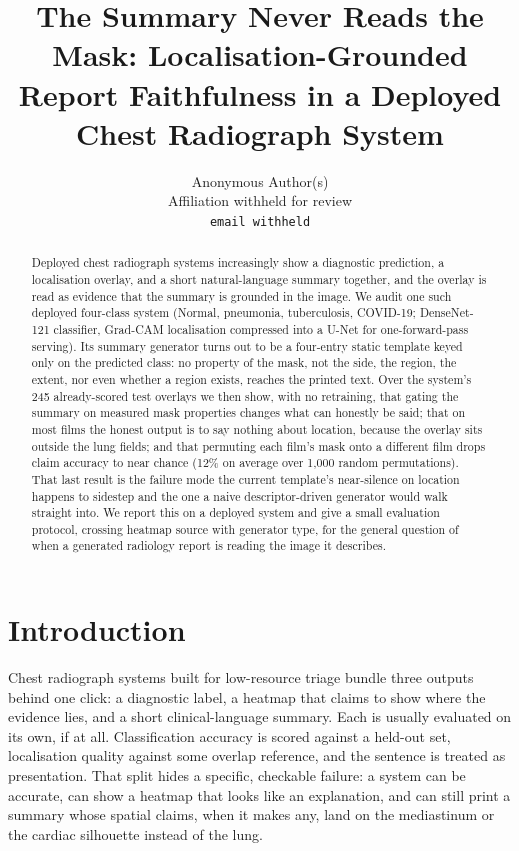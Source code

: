 \documentclass{article}
\title{The Summary Never Reads the Mask: Localisation-Grounded Report Faithfulness in a Deployed Chest Radiograph System}
\author{%
  Anonymous Author(s) \\
  Affiliation withheld for review \\
  \texttt{email withheld}
}
\begin{document}
\maketitle

\begin{abstract}
Deployed chest radiograph systems increasingly show a diagnostic prediction, a localisation overlay, and a short natural-language summary together, and the overlay is read as evidence that the summary is grounded in the image. We audit one such deployed four-class system (Normal, pneumonia, tuberculosis, COVID-19; DenseNet-121 classifier, Grad-CAM localisation compressed into a U-Net for one-forward-pass serving). Its summary generator turns out to be a four-entry static template keyed only on the predicted class: no property of the mask, not the side, the region, the extent, nor even whether a region exists, reaches the printed text. Over the system's 245 already-scored test overlays we then show, with no retraining, that gating the summary on measured mask properties changes what can honestly be said; that on most films the honest output is to say nothing about location, because the overlay sits outside the lung fields; and that permuting each film's mask onto a different film drops claim accuracy to near chance (12\% on average over 1{,}000 random permutations). That last result is the failure mode the current template's near-silence on location happens to sidestep and the one a naive descriptor-driven generator would walk straight into. We report this on a deployed system and give a small evaluation protocol, crossing heatmap source with generator type, for the general question of when a generated radiology report is reading the image it describes.
\end{abstract}

\section{Introduction}

Chest radiograph systems built for low-resource triage bundle three outputs behind one click: a diagnostic label, a heatmap that claims to show where the evidence lies, and a short clinical-language summary. Each is usually evaluated on its own, if at all. Classification accuracy is scored against a held-out set, localisation quality against some overlap reference, and the sentence is treated as presentation. That split hides a specific, checkable failure: a system can be accurate, can show a heatmap that looks like an explanation, and can still print a summary whose spatial claims, when it makes any, land on the mediastinum or the cardiac silhouette instead of the lung.
\end{document}
